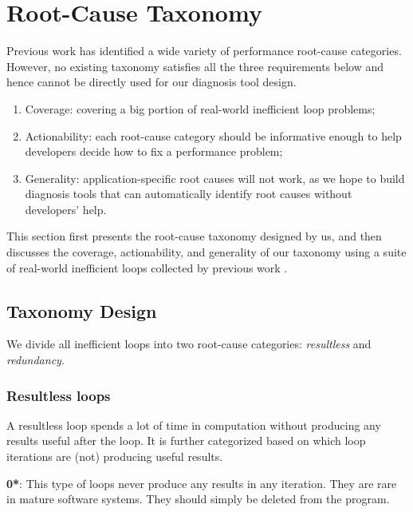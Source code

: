 \section{Root-Cause Taxonomy}
\label{sec:study}

Previous work has identified a wide variety of performance root-cause 
categories. However, no existing taxonomy satisfies all the three 
requirements below and hence cannot be directly used for our diagnosis tool
design.
\begin{enumerate}
\item Coverage: covering
a big portion of real-world inefficient loop problems; 
\item Actionability: each root-cause category should be informative enough 
to help developers
decide how to fix a performance problem; 
\item Generality: application-specific root causes will not work, as we
hope to build diagnosis tools that can automatically identify root causes 
without developers' help.
\end{enumerate}

This section first presents the root-cause taxonomy designed by us, 
and then discusses the coverage, actionability, and generality
of our taxonomy using a suite of real-world
inefficient loops collected by previous work \cite{SongOOPSLA2014,PerfBug}. 

\subsection{Taxonomy Design}
\label{sec:study_tax}
We divide all inefficient loops into two root-cause categories:
\textit{resultless} and \textit{redundancy}.

\subsubsection{Resultless loops}
A resultless loop spends a lot of time in computation without
producing any results useful after the loop.
It is further categorized based on which loop iterations are
(not) producing useful results.

{\textbf{0*}}: 
This type of loops never produce any results in any iteration.
They are rare in mature software systems.
They should simply be deleted from the program.


